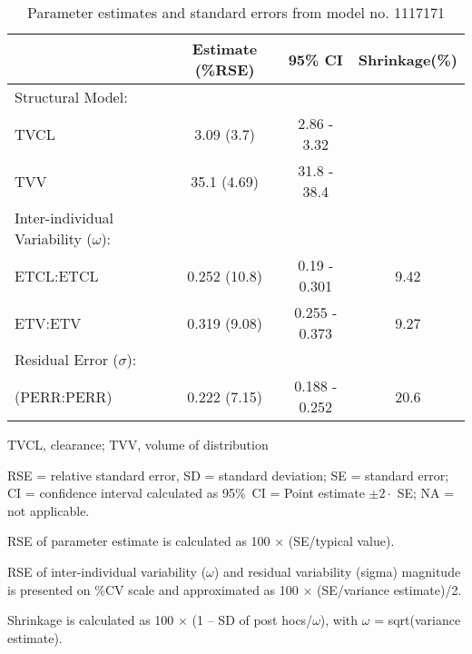 \begin{table}[ht]
\begin{threeparttable}
\centering
\caption{Parameter estimates and standard errors from model no. 1117171} 
\label{tab:paramsum1117171}
\begingroup\small
\begin{tabular}{lccc}
  \hline
 & Estimate (\%RSE) & 95\% CI & Shrinkage(\%) \\ 
  \hline
Structural Model: &  &  &  \\ 
  TVCL & 3.09 (3.7) & 2.86 - 3.32 &  \\ 
  TVV & 35.1 (4.69) & 31.8 - 38.4 &  \\ 
  Inter-individual Variability ($\omega$): &  &  &  \\ 
  ETCL:ETCL & 0.252 (10.8) & 0.19 - 0.301 & 9.42 \\ 
  ETV:ETV & 0.319 (9.08) & 0.255 - 0.373 & 9.27 \\ 
  Residual Error ($\sigma$): &  &  &  \\ 
   (PERR:PERR) & 0.222 (7.15) & 0.188 - 0.252 & 20.6 \\ 
   \hline
\end{tabular}
\endgroup
\begin{tablenotes}\footnotesize
\item[] TVCL, clearance; TVV, volume of distribution
\item[] RSE = relative standard error, SD = standard deviation; SE = standard error; CI = confidence interval calculated as 95\%~CI = Point estimate $\pm 2 \cdot$ SE; NA = not applicable.
\item[] RSE of parameter estimate is calculated as 100 × (SE/typical value).
\item[] RSE of inter-individual variability ($\omega$) and residual variability (sigma) magnitude  is presented on \%CV scale and approximated as 100 × (SE/variance estimate)/2.
\item[] Shrinkage is calculated as 100 × (1 – SD of post hocs/$\omega$), with $\omega$ = sqrt(variance estimate).
\end{tablenotes}
\end{threeparttable}
\end{table}
